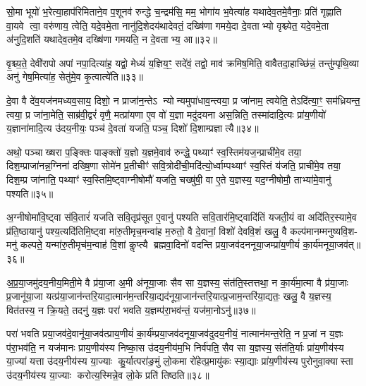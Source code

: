 सो॒मा भूयो॑ भ॒रेत्या॒हाप॑रिमिताने॒व प॒शूनव॑ रुन्द्धे च॒न्द्रम॑सि॒ मम॒ भोगा॑य भ॒वेत्या॑ह यथादेव॒तमे॒वैनाः॒ प्रति॑ गृह्णाति वा॒यवे त्वा॒ वरु॑णाय॒ त्वेति॒ यदे॒वमे॒ता नानु॑दि॒शेदय॑थादेवतं॒ दख्षि॑णा गमये॒दा दे॒वताभ्यो वृश्च्येत॒ यदे॒वमे॒ता अ॑नुदि॒शति॑ यथादेव॒तमे॒व दख्षि॑णा गमयति॒ न दे॒वताभ्य॒ आ॥३२॥

वृ॒श्च्य॒ते॒ देवी॑रापो अपां नपा॒दित्या॑ह॒ यद्वो॒ मेध्यं॑ य॒ज्ञिय॒ꣳ॒ सदे॑वं॒ तद्वो॒ माव॑ क्रमिष॒मिति॒ वावैतदा॒हाच्छि॑न्नं॒ तन्तु॑म्पृथि॒व्या अनु॑ गेष॒मित्या॑ह॒ सेतु॑मे॒व कृ॒त्वात्ये॑ति॥३३॥

{\anuvakamend[{भु॒ञ्ज॒ते॒ऽयञ्छि॑न्द्याद्रुन्धे॒ऽग्निरा॑ह दे॒व इय॑द्दे॒वताभ्य॒ आ त्रय॑स्त्रिशच्च॥४॥}]}

दे॒वा वै दे॑व॒यज॑नमध्यव॒साय॒ दिशो॒ न प्राजा॑न॒न्तेऽ न्योन्यमुपा॑धाव॒न्त्वया॒ प्र जा॑नाम॒ त्वयेति॒ तेऽदि॑त्या॒ꣳ॒ सम॑ध्रियन्त॒ त्वया॒ प्र जा॑ना॒मेति॒ साब्र॑वी॒द्वरं॑ वृणै॒ मत्प्रा॑यणा ए॒व वो॑ य॒ज्ञा मदु॑दयना अस॒न्निति॒ तस्मा॑दादि॒त्यः प्रा॑य॒णीयो॑ य॒ज्ञाना॑मादि॒त्य उ॑दय॒नीयः॒ पञ्च॑ दे॒वता॑ यजति॒ पञ्च॒ दिशो॑ दि॒शाम्प्रज्ञात्यै॥३४॥

अथो॒ पञ्चाख्षरा प॒ङ्क्तिः पाङ्क्तो॑ य॒ज्ञो य॒ज्ञमे॒वाव॑ रुन्द्धे॒ पथ्याꣳ॑ स्व॒स्तिम॑यज॒न्प्राची॑मे॒व तया॒ दिश॒म्प्राजा॑नन्न॒ग्निना॑ दख्षि॒णा सोमे॑न प्र॒तीचीꣳ॑ सवि॒त्रोदी॑ची॒मदि॑त्यो॒र्ध्वाम्पथ्याꣳ॑ स्व॒स्तिं य॑जति॒ प्राची॑मे॒व तया॒ दिश॒म्प्र जा॑नाति॒ पथ्याꣳ॑ स्व॒स्तिमि॒ष्ट्वाग्नीषोमौ॑ यजति॒ चख्षु॑षी॒ वा ए॒ते य॒ज्ञस्य॒ यद॒ग्नीषोमौ॒ ताभ्या॑मे॒वानु॑ पश्यति॥३५॥

अ॒ग्नीषोमा॑वि॒ष्ट्वा स॑वि॒तारं॑ यजति सवि॒तृप्र॑सूत ए॒वानु॑ पश्यति सवि॒तार॑मि॒ष्ट्वादि॑तिं यजती॒यं वा अदि॑तिर॒स्यामे॒व प्र॑ति॒ष्ठायानु॑ पश्य॒त्यदि॑तिमि॒ष्ट्वा मा॑रु॒तीमृच॒मन्वा॑ह म॒रुतो॒ वै दे॒वानां॒ विशो॑ देववि॒शं खलु॒ वै कल्प॑मानम्मनुष्यवि॒श- मनु॑ कल्पते॒ यन्मा॑रु॒तीमृच॑म॒न्वाह॑ वि॒शां कॢप्त्यै ब्रह्मवा॒दिनो॑ वदन्ति प्रया॒जव॑दननूया॒जम्प्रा॑य॒णीयं॑ का॒र्य॑मनूया॒जव॑त्॥३६॥

अ॒प्र॒या॒जमु॑दय॒नीय॒मिती॒मे वै प्र॑या॒जा अ॒मी अ॑नूया॒जाः सैव सा य॒ज्ञस्य॒ संत॑ति॒स्तत्तथा॒ न का॒र्य॑मा॒त्मा वै प्र॑या॒जाः प्र॒जानू॑या॒जा यत्प्र॑या॒जान॑न्तरि॒यादा॒त्मान॑म॒न्तरि॑या॒द्यद॑नूया॒जान॑न्तरि॒यात्प्र॒जाम॒न्तरि॑या॒द्यतः॒ खलु॒ वै य॒ज्ञस्य॒ वित॑तस्य॒ न क्रि॒यते॒ तदनु॑ य॒ज्ञः परा॑ भवति य॒ज्ञम्प॑रा॒भव॑न्तं॒ यज॑मा॒नोऽनु॑॥३७॥

परा॑ भवति प्रया॒जव॑दे॒वानू॑या॒जव॑त्प्राय॒णीयं॑ का॒र्य॑म्प्रया॒जव॑दनूया॒जव॑दुदय॒नीयं॒ नात्मान॑मन्त॒रेति॒ न प्र॒जां न य॒ज्ञः प॑रा॒भव॑ति॒ न यज॑मानः प्राय॒णीय॑स्य निष्का॒स उ॑दय॒नीय॑म॒भि निर्व॑पति॒ सैव सा य॒ज्ञस्य॒ संत॑ति॒र्याः प्रा॑य॒णीय॑स्य या॒ज्या॑ यत्ता उ॑दय॒नीय॑स्य या॒ज्याः कु॒र्यात्परा॑ङ॒मुं लो॒कमा रो॑हेत्प्र॒मायु॑कः स्या॒द्याः प्रा॑य॒णीय॑स्य पुरोनुवा॒क्यास्ता उ॑दय॒नीय॑स्य या॒ज्याः करोत्य॒स्मिन्ने॒व लो॒के प्रति॑ तिष्ठति॥३८॥


